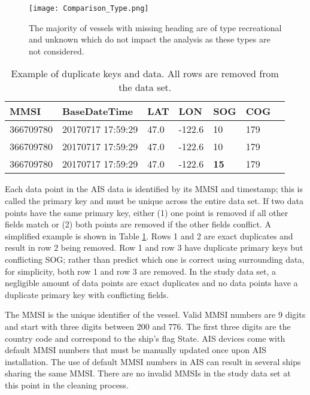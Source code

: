 \documentclass[twoside,symmetric,notoc]{tufte-book}
\begin{document}
\par{%
\begin{figure*}
    \centering
    \texttt{[image: Comparison\_Type.png]}
    \caption{The majority of vessels with missing heading are of type recreational and unknown which do not impact the analysis as these types are not considered.}
    \label{fig:missingtype}
    \forceversofloat
\end{figure*}
\begin{table}
    \centering
    \begin{tabular}{l l l l l l l }
     MMSI       & BaseDateTime      & LAT   & LON    & SOG          & COG \\
     \hline
     366709780  & 20170717 17:59:29 & 47.0  & -122.6 & 10           & 179 \\
     366709780	& 20170717 17:59:29 & 47.0  & -122.6 & 10           & 179 \\
     366709780	& 20170717 17:59:29 & 47.0  & -122.6 & \textbf{15}  & 179 \\
     \hline
    \end{tabular}
    \vspace{0.1in}
    \caption{Example of duplicate keys and data. All rows are removed from the data set.}
    \label{tab:dataDuplicate}
\end{table}
Each data point in the AIS data is identified by its MMSI and timestamp; this is called the primary key and must be unique across the entire data set. If two data points have the same primary key, either (1) one point is removed if all other fields match or (2) both points are removed if the other fields conflict. A simplified example is shown in Table \ref{tab:dataDuplicate}. Rows 1 and 2 are exact duplicates and result in row 2 being removed. Row 1 and row 3 have duplicate primary keys but conflicting SOG; rather than predict which one is correct using surrounding data, for simplicity, both row 1 and row 3 are removed. In the study data set, a negligible amount of data points are exact duplicates and no data points have a duplicate primary key with conflicting fields. 

}
\par{%
The MMSI is the unique identifier of the vessel. Valid MMSI numbers are 9 digits and start with three digits between 200 and 776. The first three digits are the country code and correspond to the ship's flag State. AIS devices come with default MMSI numbers that must be manually updated once upon AIS installation. The use of default MMSI numbers in AIS can result in several ships sharing the same MMSI. There are no invalid MMSIs in the study data set at this point in the cleaning process. 
}
\end{document}
